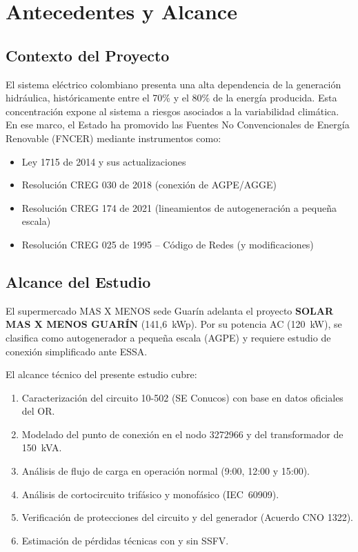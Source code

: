 \chapter{Antecedentes y Alcance}

\section{Contexto del Proyecto}

El sistema eléctrico colombiano presenta una alta dependencia de la generación hidráulica, históricamente entre el 70\% y el 80\% de la energía producida. Esta concentración expone al sistema a riesgos asociados a la variabilidad climática. En ese marco, el Estado ha promovido las Fuentes No Convencionales de Energía Renovable (FNCER) mediante instrumentos como:

\begin{itemize}
    \item Ley 1715 de 2014 y sus actualizaciones
    \item Resolución CREG 030 de 2018 (conexión de AGPE/AGGE)
    \item Resolución CREG 174 de 2021 (lineamientos de autogeneración a pequeña escala)
    \item Resolución CREG 025 de 1995 -- Código de Redes (y modificaciones)
\end{itemize}

\section{Alcance del Estudio}

El supermercado MAS X MENOS sede Guarín adelanta el proyecto \textbf{SOLAR MAS X MENOS GUARÍN} (141,6~kWp). Por su potencia AC (120~kW), se clasifica como autogenerador a pequeña escala (AGPE) y requiere estudio de conexión simplificado ante ESSA.

El alcance técnico del presente estudio cubre:

\begin{enumerate}
    \item Caracterización del circuito 10-502 (SE Conucos) con base en datos oficiales del OR.
    \item Modelado del punto de conexión en el nodo 3272966 y del transformador de 150~kVA.
    \item Análisis de flujo de carga en operación normal (9:00, 12:00 y 15:00).
    \item Análisis de cortocircuito trifásico y monofásico (IEC~60909).
    \item Verificación de protecciones del circuito y del generador (Acuerdo CNO 1322).
    \item Estimación de pérdidas técnicas con y sin SSFV.
\end{enumerate}

